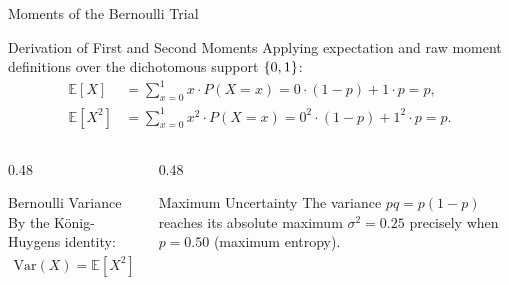 \documentclass[aspectratio=169,xcolor={dvipsnames,table}]{beamer}
\begin{document}
\begin{frame}{Moments of the Bernoulli Trial}
	\begin{block}{Derivation of First and Second Moments}
		\small
		Applying expectation and raw moment definitions over the dichotomous support $\left\{ 0, 1 \right\}$:
		\begin{align*}
			\mathbb{E}[X] &= \sum_{x=0}^1 x \cdot P(X=x) = 0 \cdot (1-p) + 1 \cdot p = p, \\
			\mathbb{E}[X^2] &= \sum_{x=0}^1 x^2 \cdot P(X=x) = 0^2 \cdot (1-p) + 1^2 \cdot p = p.
		\end{align*}
	\end{block}
	\vspace{-0.15cm}
	\begin{columns}[T]
		\begin{column}{0.48\textwidth}
			\begin{exampleblock}{Bernoulli Variance}
				\footnotesize
				By the König-Huygens identity:
				\begin{align*}
					\text{Var}(X) = \mathbb{E}[X^2] - (\mathbb{E}[X])^2 = p - p^2 = pq.
				\end{align*}
			\end{exampleblock}
		\end{column}
		\begin{column}{0.48\textwidth}
			\begin{alertblock}{Maximum Uncertainty}
				\footnotesize
				The variance $pq = p(1-p)$ reaches its absolute maximum $\sigma^2 = 0.25$ precisely when $p = 0.50$ (maximum entropy).
			\end{alertblock}
		\end{column}
	\end{columns}
\end{frame}
\end{document}
